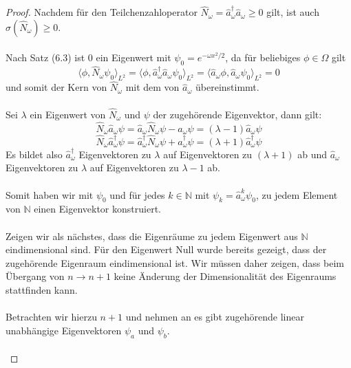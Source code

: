 \documentclass[11pt,a4paper,leqno]{report}
\numberwithin{equation}{chapter}
\begin{document}
\begin{proof}
	Nachdem f\"ur den Teilchenzahloperator $\hat{N}_\omega =\hat{a}^\dagger_\omega\hat{a}_\omega\geq 0$ gilt, ist auch $\sigma(\hat{N}_\omega)\geq 0$.\\
	\\
	Nach Satz (6.3) ist $0$ ein Eigenwert mit $\psi_0=e^{-\omega x^2 / 2}$, da f\"ur beliebiges $\phi\in \Omega$ gilt
	\begin{equation*}
		\langle \phi, \hat{N}_\omega\psi_0\rangle_{L^2}=\langle \phi, \hat{a}^\dagger_\omega\hat{a}_\omega\psi_0\rangle_{L^2}=\langle \hat{a}_\omega\phi, \hat{a}_\omega\psi_0\rangle_{L^2}=0
	\end{equation*}
und somit der Kern von $\hat{N}_\omega$ mit dem von $\hat{a}_\omega$ \"ubereinstimmt.\\
\\
Sei $\lambda$ ein Eigenwert von $\hat{N}_\omega$ und $\psi$ der zugeh\"orende Eigenvektor, dann gilt:
\begin{equation*}
	\hat{N}_\omega\hat{a}_\omega\psi=\hat{a}_\omega\hat{N}_\omega\psi-\hat{a}_\omega\psi=(\lambda -1)\hat{a}_\omega\psi
\end{equation*}
\begin{equation*}
	\hat{N}_\omega\hat{a}_\omega^\dagger\psi=\hat{a}_\omega^\dagger\hat{N}_\omega\psi+\hat{a}_\omega^\dagger\psi=(\lambda +1)\hat{a}_\omega^\dagger\psi
\end{equation*}
Es bildet also $\hat{a}_\omega^\dagger$ Eigenvektoren zu $\lambda$ auf Eigenvektoren zu $(\lambda + 1)$ ab und $\hat{a}_\omega$ Eigenvektoren zu $\lambda $ auf Eigenvektoren zu $\lambda -1$ ab.\\
\\
Somit haben wir mit $\psi_0$ und f\"ur jedes $k\in\mathbb{N}$ mit $\psi_k= \hat{a}_\omega^k\psi_0$, zu jedem Element von $\mathbb{N}$ einen Eigenvektor konstruiert.\\
\\
Zeigen wir als n\"achstes, dass die Eigenr\"aume zu jedem Eigenwert aus $\mathbb{N}$ eindimensional sind.
F\"ur den Eigenwert Null wurde bereits gezeigt, dass der zugeh\"orende Eigenraum eindimensional ist. Wir m\"ussen daher zeigen, dass beim \"Ubergang von $n\rightarrow n+1$ keine \"Anderung der Dimensionalit\"at des Eigenraums stattfinden kann.\\
\\
Betrachten wir hierzu $n+1$ und nehmen an es gibt  zugeh\"orende linear unabh\"angige Eigenvektoren $\psi_a$ und $\psi_b$.\\
\\

\end{proof}
\end{document}
